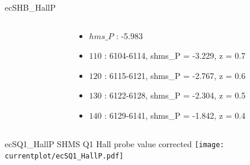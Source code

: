\documentclass[aspectratio=169,xcolor=dvipsnames]{beamer}
\begin{document}
\begin{frame}{ecSHB\_HallP}
\begin{columns}
\begin{column}[T]{0.5\textwidth}
\end{column}
\begin{column}[T]{0.5\textwidth}
\smaller
\begin{itemize}
  \item $hms\_P$ : -5.983
    \item $110$ : 6104-6114, shms\_P = -3.229, z = 0.7
    \item $120$ : 6115-6121, shms\_P = -2.767, z = 0.6
    \item $130$ : 6122-6128, shms\_P = -2.304, z = 0.5
    \item $140$ : 6129-6141, shms\_P = -1.842, z = 0.4
\end{itemize}
\end{column}
\end{columns}    
\end{frame}




\begin{frame}{ecSQ1\_HallP}
SHMS Q1 Hall probe value corrected
    \texttt{[image: currentplot/ecSQ1\_HallP.pdf]}
\end{frame}
\end{document}
